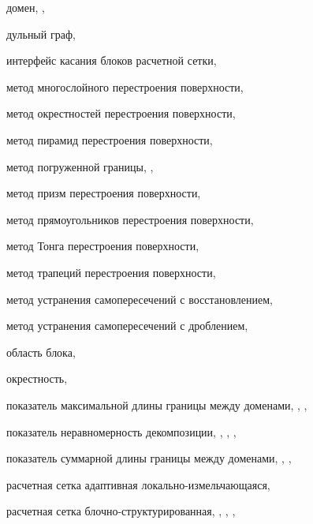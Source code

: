 домен, \pageref{term:domain}, \pageref{term:domain2}

дульный граф, \pageref{term:dual_graph}

интерфейс касания блоков расчетной сетки, \pageref{term:block_interface}

метод многослойного перестроения поверхности, \pageref{term:method_remesh_multi}

метод окрестностей перестроения поверхности, \pageref{term:method_remesh_okr}

метод пирамид перестроения поверхности, \pageref{term:method_remesh_pyramid}

метод погруженной границы, \pageref{term:immersed_boundary_method}, \pageref{term:immersed_boundary_method2}

метод призм перестроения поверхности, \pageref{term:method_remesh_prism}

метод прямоугольников перестроения поверхности, \pageref{term:method_remesh_rect}

метод Тонга перестроения поверхности, \pageref{term:method_remesh_tong}

метод трапеций перестроения поверхности, \pageref{term:method_remesh_trap}

метод устранения самопересечений с восстановлением, \pageref{term:method_selfint_repare}

метод устранения самопересечений с дроблением, \pageref{term:method_selfint_cut}

область блока, \pageref{term:block_scope}

окрестность, \pageref{term:okrestnost}

показатель максимальной длины границы между доменами, \pageref{term:decomp_maxbord}, \pageref{term:decomp_maxbord2}, \pageref{term:decomp_maxbord3}

показатель неравномерность декомпозиции, \pageref{term:decomp_neravn}, \pageref{term:decomp_neravn2}, \pageref{term:decomp_neravn3}, \pageref{term:decomp_neravn4}

показатель суммарной длины границы между доменами, \pageref{term:decomp_sumbord}, \pageref{term:decomp_sumbord2}, \pageref{term:decomp_sumbord3}

расчетная сетка адаптивная локально-измельчающаяся, \pageref{term:mesh_adaptive}

расчетная сетка блочно-структурированная, \pageref{term:mesh_block_struct}, \pageref{term:mesh_block_struct2}, \pageref{term:mesh_block_struct3}, \pageref{term:mesh_block_struct4}

